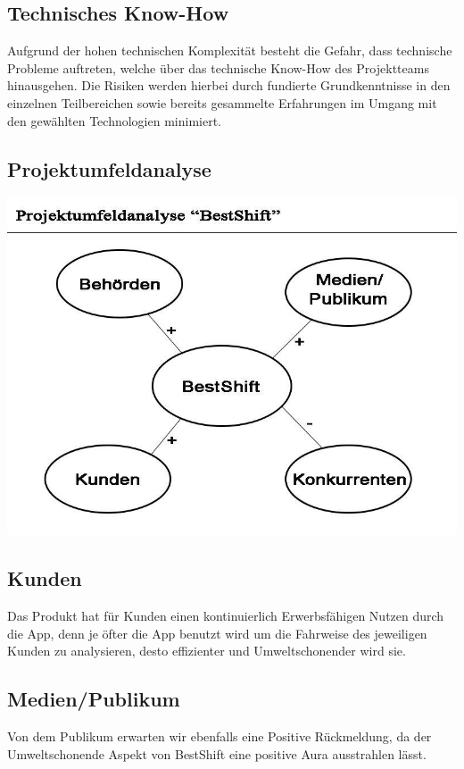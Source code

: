 \subsection{Technisches Know-How}
Aufgrund der hohen technischen Komplexität besteht die Gefahr, 
dass technische Probleme auftreten, welche über das technische Know-How des Projektteams 
hinausgehen. Die Risiken werden hierbei durch fundierte Grundkenntnisse in den einzelnen Teilbereichen sowie bereits gesammelte Erfahrungen im Umgang mit den gewählten Technologien minimiert. 


\subsection{Projektumfeldanalyse}
\includegraphics[scale=0.5]{images/Puma.jpg}

\newpage
\subsection{Kunden}
Das Produkt hat für Kunden einen kontinuierlich Erwerbsfähigen Nutzen durch die App,
denn je öfter die App benutzt wird um die Fahrweise des jeweiligen Kunden zu analysieren,
desto effizienter und Umweltschonender wird sie. 

\subsection{Medien/Publikum}
Von dem Publikum erwarten wir ebenfalls eine Positive Rückmeldung,
da der Umweltschonende Aspekt von BestShift eine positive Aura ausstrahlen lässt.

